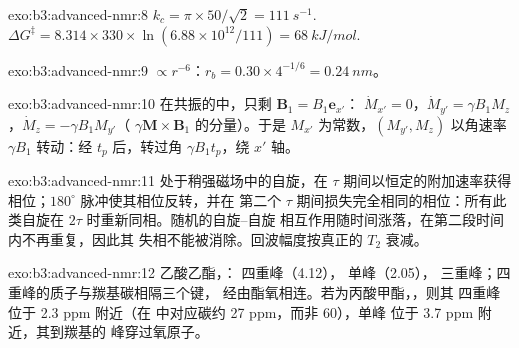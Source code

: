 \begin{solution}{exo:b3:advanced-nmr:8}
$k_c = \pi \times 50/\sqrt2 = \qty{111}{s^{-1}}$. $\Delta G^\ddagger = 8.314 \times 330 \times
\ln(6.88\times10^{12}/111) = \qty{68}{kJ/mol}$.
\end{solution}

\begin{solution}{exo:b3:advanced-nmr:9}
 $\propto r^{-6}$：$r_b = 0.30 \times 4^{-1/6} = \qty{0.24}{nm}$。
\end{solution}

\begin{solution}{exo:b3:advanced-nmr:10}
在共振的中，只剩 $\mathbf B_1 = B_1\mathbf e_{x'}$：
$\dot M_{x'} = 0$，$\dot M_{y'} = \gamma B_1M_z$，$\dot M_z = -\gamma B_1M_{y'}$（
$\gamma\mathbf M\times\mathbf B_1$ 的分量）。于是 $M_{x'}$ 为常数，$(M_{y'}, M_z)$ 以角速率
$\gamma B_1$ 转动：经 $t_p$ 后，转过角 $\gamma B_1t_p$，绕 $x'$ 轴。
\end{solution}

\begin{solution}{exo:b3:advanced-nmr:11}
处于稍强磁场中的自旋，在
$\tau$ 期间以恒定的附加速率获得相位；$180^\circ$ 脉冲使其相位反转，并在
第二个 $\tau$ 期间损失完全相同的相位：所有此类自旋在 $2\tau$ 时重新同相。随机的自旋–自旋
相互作用随时间涨落，在第二段时间内不再重复，因此其
失相不能被消除。回波幅度按真正的 $T_2$ 衰减。
\end{solution}

\begin{solution}{exo:b3:advanced-nmr:12}
乙酸乙酯，： 四重峰（4.12）， 单峰（2.05），
 三重峰；四重峰的质子与羰基碳相隔三个键，
经由酯氧相连。若为丙酸甲酯，，则其
四重峰位于 2.3 ppm 附近（在  中对应碳约 27 ppm，而非 60），单峰
 位于 3.7 ppm 附近，其到羰基的  峰穿过氧原子。
\end{solution}

